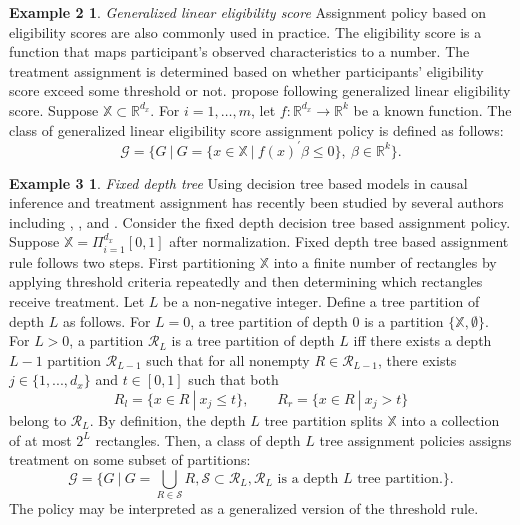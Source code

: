 \documentclass[12pt,oneside,reqno,english]{amsart}
\theoremstyle{definition}
\newtheorem*{ex2}{Example 2}
\newtheorem*{ex3}{Example 3}
\begin{document}
\begin{ex2}
\textit{Generalized linear eligibility score} \citep{KT:18} Assignment policy based on eligibility scores are also commonly used in practice. The eligibility score is a function that maps participant's observed characteristics to a number. The treatment assignment is determined based on whether participants' eligibility score exceed some threshold or not. \cite{KT:18} propose following generalized linear eligibility score. 
Suppose $\mathbb{X}\subset \mathbb{R}^{d_{x}}$. For $i=1,\ldots,m$, let $f:\mathbb{R}^{d_{x}}\rightarrow \mathbb{R}^{k}$ be a known function. 
The class of generalized linear eligibility score assignment policy is defined as follows:
\[\mathcal{G}=\{G\ |\ G=\{x\in \mathbb{X} \ | \ f(x)^{\prime}\beta \leq 0 \},\ \beta\in \mathbb{R}^{k}\}.\]
\end{ex2}
\begin{ex3}
\textit{Fixed depth tree} Using decision tree based models in causal inference and treatment assignment has recently been studied by several authors including 
\cite{AI:16}, \cite{Kallus:16}, and \cite{WA:18}. 
Consider the fixed depth decision tree based assignment policy. 
Suppose  $\mathbb{X}= \Pi_{i=1}^{d_{x}}[0,1]$ after normalization. 
Fixed depth tree based assignment rule follows two steps. First partitioning $\mathbb{X}$ into a finite number of
rectangles by applying threshold criteria repeatedly and then determining which rectangles receive treatment.  
Let $L$ be a non-negative integer.  
Define a tree partition of depth $L$ as follows. 
For $L=0$,  a tree partition of depth $0$ is a partition $\{\mathbb{X},\emptyset\}$. 
For $L>0$, a partition $\mathcal{R}_{L}$ is a tree partition of depth $L$ iff there exists a depth $L-1$ partition $\mathcal{R}_{L-1}$ 
such that for all nonempty $R\in \mathcal{R}_{L-1}$, there exists $j\in\{1,...,d_{x}\}$ and 
$t\in [0,1]$ such that both 
\[R_{l}=\{x\in R \ |\  x_{j}\leq t \},\qquad R_{r}=\{x\in R \ |\  x_{j}>t \}\]
belong to $\mathcal{R}_{L}$. 
By definition, the depth $L$ tree partition splits $\mathbb{X}$ into a collection of at most $2^{L}$ rectangles. 
Then, a class of depth $L$ tree assignment policies assigns treatment on some subset of partitions:  
\[\mathcal{G}=\{G\ |\ G=\bigcup_{R\in \mathcal{S}}R,   \mathcal{S} \subset \mathcal{R}_{L}, \mathcal{R}_{L}\mbox{ is a depth $L$ tree partition.} \}.\]
The policy may be interpreted as a generalized version of the threshold rule.  
\end{ex3}
\end{document}
